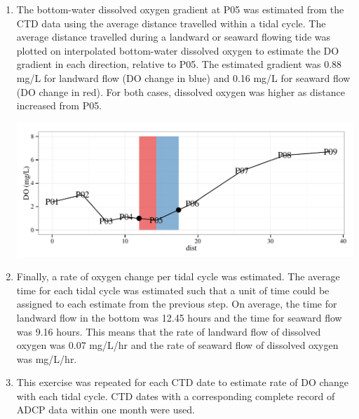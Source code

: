 \documentclass[letterpaper,12pt]{article}\usepackage[]{graphicx}\usepackage[]{color}
\makeatletter
\def\maxwidth{ %
  \ifdim\Gin@nat@width>\linewidth
    \linewidth
  \else
    \Gin@nat@width
  \fi
}
\makeatother
\begin{document}
\begin{enumerate}
{{}



}
\item{

The bottom-water dissolved oxygen gradient at P05 was estimated from the CTD data using the average distance travelled within a tidal cycle.  The average distance travelled during a landward or seaward flowing tide was plotted on interpolated bottom-water dissolved oxygen to estimate the DO gradient in each direction, relative to P05.  The estimated gradient was 0.88 mg/L for landward flow (DO change in blue) and 0.16 mg/L for seaward flow (DO change in red).  For both cases, dissolved oxygen was higher as distance increased from P05.  


{\centering \includegraphics[width=\maxwidth]{figs/unnamed-chunk-5-1} 

}



}
\item{
Finally, a rate of oxygen change per tidal cycle was estimated.  The average time for each tidal cycle was estimated such that a unit of time could be assigned to each estimate from the previous step.  On average, the time for landward flow in the bottom was 12.45 hours and the time for seaward flow was 9.16 hours. This means that the rate of landward flow of dissolved oxygen was 0.07 mg/L/hr and the rate of seaward flow of dissolved oxygen was  mg/L/hr.
}
\item{
This exercise was repeated for each CTD date to estimate rate of DO change with each tidal cycle.  CTD dates with a corresponding complete record of ADCP data within one month were used.


}
\end{enumerate}
\end{document}
